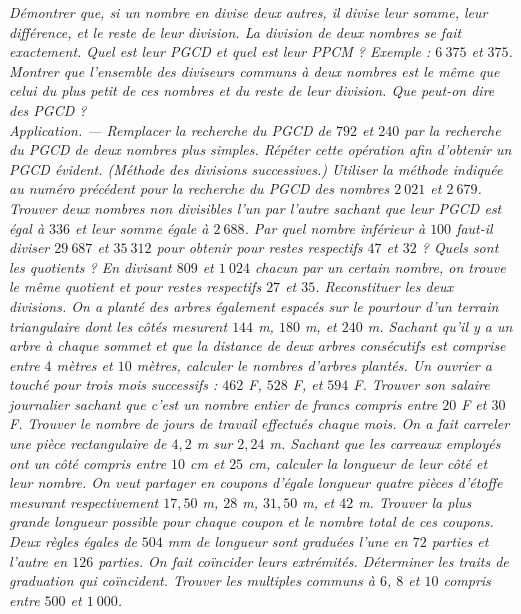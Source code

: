 \begin{itemize}
\begin{enumerate}
 \end{enumerate}
 \it Démontrer que, si un nombre en divise deux autres, il divise leur somme, leur différence, et le reste de 
 leur division. 
 \it La division de deux nombres se fait exactement. Quel
 est leur PGCD et quel est leur PPCM ? Exemple : $6~375$
 et $375$. 
 \it Montrer que l'ensemble des diviseurs communs à deux nombres est le même que celui du plus petit de ces nombres et du reste de leur division. Que peut-on dire des PGCD ? \\ 
 \emph{Application.} — Remplacer la recherche du PGCD de $792$ et $240$ par la recherche du PGCD de deux nombres plus simples. Répéter cette opération afin d'obtenir un
 PGCD évident. (\emph{Méthode des divisions successives}.)
 \it Utiliser la méthode indiquée au numéro précédent pour la recherche du PGCD des nombres $2~021$ et $2~679$. 
 \it Trouver deux nombres non divisibles l'un par l'autre sachant que leur PGCD est égal à $336$ et leur somme 
 égale à $2~688$. 
 \it Par quel nombre inférieur à $100$ faut-il diviser $29~687$ et $35~312$ pour obtenir pour restes respectifs $47$ et $32$ ? 
 Quels sont les quotients ? 
 \it En divisant $809$ et $1~024$ chacun par un certain nombre, on trouve le même quotient et pour restes respectifs $27$ et $35$. Reconstituer les deux divisions. 
 \it On a planté des arbres également espacés sur le pourtour d'un terrain triangulaire dont les côtés mesurent $144$ m, $180$ m, et $240$ m. Sachant qu'il y a un arbre à chaque sommet et que la distance de deux arbres consécutifs est comprise entre $4$ mètres et $10$ mètres, calculer le nombres d'arbres plantés.
 \it Un ouvrier a touché pour trois mois successifs : $462$ F, $528$ F, et $594$ F. Trouver son salaire journalier sachant que c'est un nombre entier de francs 
 compris entre $20$ F et $30$ F. Trouver le nombre
 de jours de travail effectués chaque mois.
 \it On a fait carreler une pièce rectangulaire de $4,2$ m sur $2,24$ m. Sachant que les carreaux employés ont un côté compris entre $10$ cm et $25$ cm, calculer la longueur de leur côté et leur nombre. 
 \it On veut partager en coupons d'égale longueur quatre pièces d'étoffe mesurant respectivement $17,50$ m, $28$ m, $31,50$ m, et $42$ m. Trouver la plus grande longueur possible pour chaque coupon et le nombre total de ces coupons. 
 \it Deux règles égales de $504$ mm de longueur sont graduées l'une en $72$ parties et l'autre en $126$ parties. On fait coïncider leurs extrémités. Déterminer les traits de graduation qui coïncident. 
 \it Trouver les multiples communs à $6$, $8$ et $10$ compris entre $500$ et $1~000$. 

\end{itemize}
